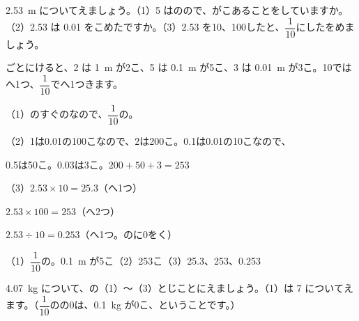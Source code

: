 \begin{reidai}
\qty{2.53}{m} についてえましょう。（1）5 はのので、がこあることをしていますか。（2）2.53 は 0.01 をこめたですか。（3）2.53 を10、100したと、$\dfrac{1}{10}$にしたをめましょう。\par
\kangaekata {}ごとにけると、2 は \qty{1}{m} が2こ、5 は \qty{0.1}{m} が5こ、3 は \qty{0.01}{m} が3こ。10ではへ1つ、$\dfrac{1}{10}$でへ1つきます。\par
\shiki （1）のすぐのなので、$\dfrac{1}{10}$の。\par
\hspace*{2.6\zw}（2）1は0.01の100こなので、2は200こ。0.1は0.01の10こなので、\par
\hspace*{4.6\zw}0.5は50こ。0.03は3こ。$200+50+3=253$\par
\hspace*{2.6\zw}（3）$2.53\times10=25.3$\quad（へ1つ）\par
\hspace*{4.6\zw}$2.53\times100=253$\quad（へ2つ）\par
\hspace*{4.6\zw}$2.53\div10=0.253$\quad（へ1つ。のに0をく）\par
\kotae （1）$\dfrac{1}{10}$の。\qty{0.1}{m} が5こ\quad（2）253こ\quad（3）25.3、253、0.253
\end{reidai}

\begin{jibun}
\qty{4.07}{kg} について、の（1）〜（3）とじことにえましょう。（1）は 7 についてえます。（$\dfrac{1}{10}$のの0は、\qty{0.1}{kg} が0こ、ということです。）
\end{jibun}

